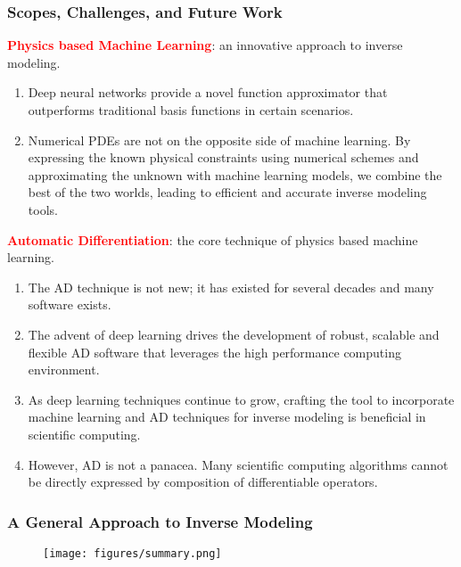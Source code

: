 \documentclass[usenames,dvipsnames]{beamer}
\begin{document}
\begin{frame}
	\frametitle{Scopes, Challenges, and Future Work}
	\textcolor{red}{\textbf{Physics based Machine Learning}}: an innovative approach to inverse modeling. 
	{\scriptsize
	\begin{enumerate}
		\item Deep neural networks provide a novel function approximator that outperforms traditional basis functions in certain scenarios. 
		\item Numerical PDEs are not on the opposite side of machine learning. By expressing the known physical constraints using numerical schemes and approximating the unknown with machine learning models, we combine the best of the two worlds, leading to efficient and accurate inverse modeling tools. 
	\end{enumerate}
	}
		
		\textcolor{red}{\textbf{Automatic Differentiation}}: the core technique of physics based machine learning.
		{\scriptsize
		\begin{enumerate}
		\item The AD technique is not new; it has existed for several decades and many software exists. 
		\item The advent of deep learning drives the development of robust, scalable and flexible AD software that leverages the high performance computing environment. 
		\item As deep learning techniques continue to grow, crafting the tool to incorporate machine learning and AD techniques for inverse modeling is beneficial in scientific computing.
		\item However, AD is not a panacea. Many scientific computing algorithms cannot be directly expressed by composition of differentiable operators. 
	\end{enumerate}
	}
	
\end{frame}

\begin{frame}
	\frametitle{A General Approach to Inverse Modeling}
	\begin{figure}[hbt]
  \texttt{[image: figures/summary.png]}
\end{figure}

\end{frame}





\end{document}
